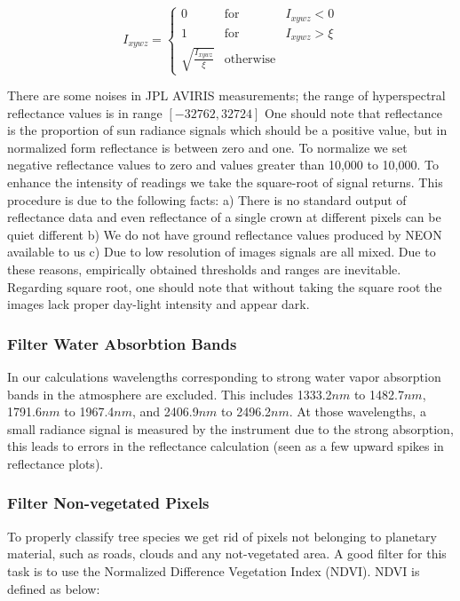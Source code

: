 \documentclass[remotesensing,article,accept,moreauthors,pdftex,12pt,a4paper]{mdpi}
\begin{document}
\begin{equation}
I_{xywz} = \left\{ \begin{array}{rcl}
0 & \mbox{for} & I_{xywz} < 0 \\ 
1 & \mbox{for} & I_{xywz} > \xi \\
\sqrt{\frac{I_{xywz}}{\xi}} & \mbox{otherwise} & 
\end{array}\right.
\end{equation}





There are some noises in JPL AVIRIS measurements; the range of hyperspectral reflectance values is in range $[-32762, 32724]$ One should note that reflectance is the proportion of sun radiance signals which should be a positive value, but in normalized form reflectance is between zero and one. To normalize we set negative reflectance values to zero and values greater than 10,000 to 10,000. To enhance the intensity of readings we take the square-root of signal returns. This procedure is due to the following facts: a) There is no standard output of reflectance data and even reflectance of a single crown at different pixels can be quiet different b) We do not have ground reflectance values produced by NEON available to us c) Due to low resolution of images signals are all mixed. Due to these reasons, empirically obtained thresholds and ranges are inevitable. Regarding square root, one should note that without taking the square root the images lack proper day-light intensity and appear dark.

\subsubsection{Filter Water Absorbtion Bands}

In our calculations wavelengths corresponding to strong water vapor absorption bands in the atmosphere are excluded. This includes 1333.2$nm$ to 1482.7$nm$, 1791.6$n m$ to 1967.4$n m$, and 2406.9$n m$ to 2496.2$n m$. At those wavelengths, a small radiance signal is measured by the instrument due to the strong absorption, this leads to errors in the reflectance calculation (seen as a few upward spikes in reflectance plots). 

\subsubsection{Filter Non-vegetated Pixels}


To properly classify tree species we get rid of pixels not belonging to planetary material, such as roads, clouds and any not-vegetated area. A good filter for this task is to use the Normalized Difference Vegetation Index (NDVI). NDVI is defined as below:
\end{document}
